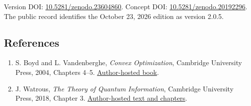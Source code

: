 \documentclass[
]{article}
\providecommand{\tightlist}{%
  \setlength{\itemsep}{0pt}\setlength{\parskip}{0pt}}
\begin{document}
Version DOI:
\href{https://doi.org/10.5281/zenodo.23604860}{10.5281/zenodo.23604860}.
Concept DOI:
\href{https://doi.org/10.5281/zenodo.20192296}{10.5281/zenodo.20192296}.
The public record identifies the October 23, 2026 edition as version
2.0.5.

\subsection{References}\label{references}

\begin{enumerate}
\def\labelenumi{\arabic{enumi}.}
\tightlist
\item
  S. Boyd and L. Vandenberghe, \emph{Convex Optimization}, Cambridge
  University Press, 2004, Chapters 4--5.
  \href{https://web.stanford.edu/~boyd/cvxbook/}{Author-hosted book}.
\item
  J. Watrous, \emph{The Theory of Quantum Information}, Cambridge
  University Press, 2018, Chapter 3.
  \href{https://cs.uwaterloo.ca/~watrous/TQI/}{Author-hosted text and
  chapters}.
\end{enumerate}
\end{document}
